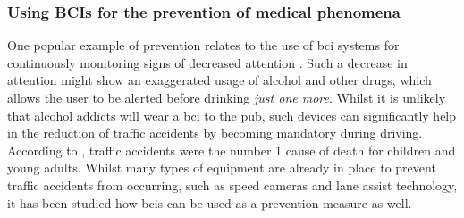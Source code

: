 
\subsubsection{Using BCIs for the prevention of medical phenomena}
\label{subsubsec:bci_common_use_cases_medical_phenomena_prevention}

One popular example of prevention relates to the use of \gls{bci} systems for continuously monitoring signs of decreased attention \citep{bci_applications}.
Such a decrease in attention might show an exaggerated usage of alcohol and other drugs, which allows the user to be alerted before drinking \textit{just one more}.
Whilst it is unlikely that alcohol addicts will wear a \gls{bci} to the pub, such devices can significantly help in the reduction of traffic accidents by becoming mandatory during driving.
According to \citet{traffic_deaths}, traffic accidents were the number 1 cause of death for children and young adults.
Whilst many types of equipment are already in place to prevent traffic accidents from occurring, such as speed cameras and lane assist technology, it has been studied how \glspl{bci} can be used as a prevention measure as well.

